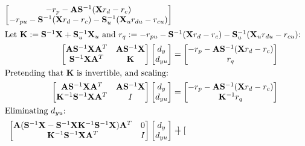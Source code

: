\documentclass[10pt,a4paper]{article}
\begin{document}
\begin{align*}
\begin{bmatrix}
	-r_p - \mathbf{A}\mathbf{S}^{-1}(\mathbf{X}r_d - r_c) \\
	-r_{pu} - \mathbf{S}^{-1}(\mathbf{X}r_d - r_c) - \mathbf{S}_u^{-1}(\mathbf{X}_ur_{du} - r_{cu})
\end{bmatrix} \\
\intertext{Let $\mathbf{K} := \mathbf{S}^{-1}\mathbf{X}+\mathbf{S}_u^{-1}\mathbf{X}_u$ and $r_q := -r_{pu} - \mathbf{S}^{-1}(\mathbf{X}r_d - r_c) - \mathbf{S}_u^{-1}(\mathbf{X}_ur_{du} - r_{cu})$:}
\begin{bmatrix}
	\mathbf{A}\mathbf{S}^{-1}\mathbf{X}\mathbf{A}^T & \mathbf{A}\mathbf{S}^{-1}\mathbf{X} \\
	\mathbf{S}^{-1}\mathbf{X}\mathbf{A}^T & \mathbf{K}
\end{bmatrix}
\begin{bmatrix}d_y \\ d_{yu}\end{bmatrix} &=
\begin{bmatrix}
	-r_p - \mathbf{A}\mathbf{S}^{-1}(\mathbf{X}r_d - r_c) \\
	r_q
\end{bmatrix} \\
\intertext{Pretending that $\mathbf{K}$ is invertible, and scaling:}
\begin{bmatrix}
	\mathbf{A}\mathbf{S}^{-1}\mathbf{X}\mathbf{A}^T & \mathbf{A}\mathbf{S}^{-1}\mathbf{X} \\
	\mathbf{K}^{-1}\mathbf{S}^{-1}\mathbf{X}\mathbf{A}^T & I
\end{bmatrix}
\begin{bmatrix}d_y \\ d_{yu}\end{bmatrix} &=
\begin{bmatrix}
	-r_p - \mathbf{A}\mathbf{S}^{-1}(\mathbf{X}r_d - r_c) \\
	\mathbf{K}^{-1}r_q
\end{bmatrix} \\
\intertext{Eliminating $d_{yu}$:}
\begin{bmatrix}
	\mathbf{A}(\mathbf{S}^{-1}\mathbf{X} - \mathbf{S}^{-1}\mathbf{X}\mathbf{K}^{-1}\mathbf{S}^{-1}\mathbf{X})\mathbf{A}^T & 0 \\
	\mathbf{K}^{-1}\mathbf{S}^{-1}\mathbf{X}\mathbf{A}^T & I
\end{bmatrix}
\begin{bmatrix}d_y \\ d_{yu}\end{bmatrix} &=
\begin{bmatrix}

\end{bmatrix}
\end{align*}
\end{document}
